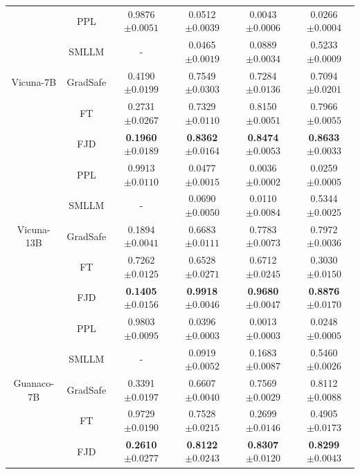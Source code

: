 \documentclass{article}
\begin{document}
\begin{table}[t]
\begin{tabular}{cccccc}
    \midrule
    \multirow{5}{*}{Vicuna-7B} 
    & PPL & 0.9876\tiny{$\pm 0.0051$} & 0.0512\tiny{$\pm 0.0039$} & 0.0043\tiny{$\pm 0.0006$} & 0.0266\tiny{$\pm 0.0004$} \\
    & SMLLM & - & 0.0465\tiny{$\pm 0.0019$} & 0.0889\tiny{$\pm 0.0034$} & 0.5233\tiny{$\pm 0.0009$} \\
    & GradSafe & 0.4190\tiny{$\pm 0.0199$} & 0.7549\tiny{$\pm 0.0303$} & 0.7284\tiny{$\pm 0.0136$} & 0.7094\tiny{$\pm 0.0201$}   \\
    & FT & 0.2731\tiny{$\pm 0.0267$} & 0.7329\tiny{$\pm 0.0110$} & 0.8150\tiny{$\pm 0.0051$} & 0.7966\tiny{$\pm 0.0055$} \\
    & FJD & \textbf{0.1960}\tiny{$\pm 0.0189$} & \textbf{0.8362}\tiny{$\pm 0.0164$} & \textbf{0.8474}\tiny{$\pm 0.0053$} & \textbf{0.8633}\tiny{$\pm 0.0033$}  \\
    \midrule
    \multirow{5}{*}{Vicuna-13B} 
    & PPL  & 0.9913\tiny{$\pm 0.0110$} & 0.0477\tiny{$\pm 0.0015$} & 0.0036\tiny{$\pm 0.0002$} & 0.0259\tiny{$\pm 0.0005$} \\
    & SMLLM & - & 0.0690\tiny{$\pm 0.0050$} & 0.0110\tiny{$\pm 0.0084$} & 0.5344\tiny{$\pm 0.0025$} \\
    & GradSafe & 0.1894\tiny{$\pm 0.0041$} & 0.6683\tiny{$\pm 0.0111$} & 0.7783\tiny{$\pm 0.0073$} & 0.7972\tiny{$\pm 0.0036$}   \\
    & FT & 0.7262\tiny{$\pm 0.0125$} & 0.6528\tiny{$\pm 0.0271$} & 0.6712\tiny{$\pm 0.0245$} & 0.3030\tiny{$\pm 0.0150$} \\
    & FJD & \textbf{0.1405}\tiny{$\pm 0.0156$} & \textbf{0.9918}\tiny{$\pm 0.0046$} & \textbf{0.9680}\tiny{$\pm 0.0047$} & \textbf{0.8876}\tiny{$\pm 0.0170$} \\

    \midrule
    \multirow{5}{*}{Guanaco-7B} 
    & PPL & 0.9803\tiny{$\pm 0.0095$} & 0.0396\tiny{$\pm 0.0003$} & 0.0013\tiny{$\pm 0.0003$} & 0.0248\tiny{$\pm 0.0005$} \\
    & SMLLM & - & 0.0919\tiny{$\pm 0.0052$} & 0.1683\tiny{$\pm 0.0087$} & 0.5460\tiny{$\pm 0.0026$} \\
    & GradSafe & 0.3391\tiny{$\pm 0.0197$} & 0.6607\tiny{$\pm 0.0040$} & 0.7569\tiny{$\pm 0.0029$} & 0.8112\tiny{$\pm 0.0088$}   \\
    & FT & 0.9729\tiny{$\pm 0.0190$} & 0.7528\tiny{$\pm 0.0215$} & 0.2699\tiny{$\pm 0.0146$} & 0.4905\tiny{$\pm 0.0173$} \\
    & FJD & \textbf{0.2610}\tiny{$\pm 0.0277$} & \textbf{0.8122}\tiny{$\pm 0.0243$} & \textbf{0.8307}\tiny{$\pm 0.0120$} & \textbf{0.8299}\tiny{$\pm 0.0043$}  \\


\end{tabular}
\end{table}
\end{document}
